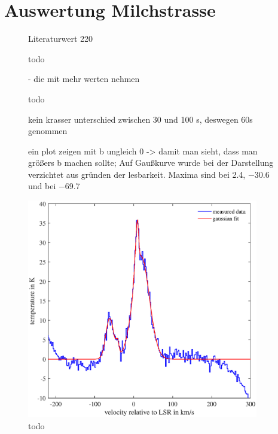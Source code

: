\section{Auswertung Milchstrasse}
\begin{figure}[H]
    \centering
    
    \caption{Literaturwert \SI{220}{} \cite{LSR}}
    \label{fig:VvonR}
\end{figure}

 \begin{figure}[H]
     \centering
     
     \caption{todo}
     \label{fig:Milchstrasse}
 \end{figure}

\begin{figure}[H]
    \centering
       
    \caption{- die mit mehr werten nehmen}
    \label{fig:Milchstrassesafe}
\end{figure}

\begin{figure}[H]
    \centering
       
    \caption{todo}
    \label{fig:Belichtungszeit}
\end{figure}

\begin{figure}[H]
    \centering
       
    \caption{kein krasser unterschied zwischen 30 und 100 s, deswegen 60s genommen}
    \label{fig:BelichtungszeitExtremal}
\end{figure}

\begin{figure}[H]
    \centering
       
    \caption{ein plot zeigen mit b ungleich 0 -> damit man sieht, dass man größers b machen sollte; Auf Gaußkurve wurde bei der Darstellung verzichtet aus gründen der lesbarkeit. Maxima sind bei \SI{2.4}{}, \SI{-30.6}{} und bei \SI{-69.7}{}}
    \label{fig:bungleichnull}
\end{figure}

\begin{figure}[H]
    \centering
    \includegraphics[width= 0.9\textwidth]{plots/TestBaseline.eps}
    \caption{todo}
    \label{fig:TestBaseline}
\end{figure}